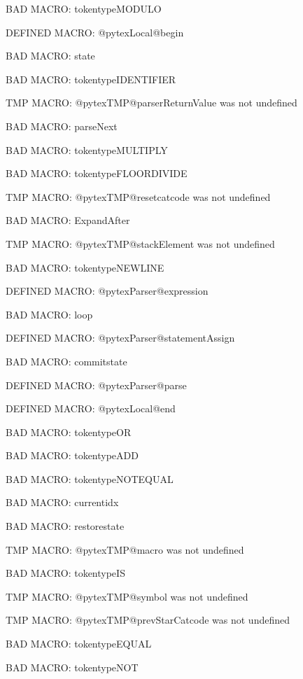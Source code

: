 BAD MACRO: tokentypeMODULO

\ifx\@pytexLocal@begin\undefined\else DEFINED MACRO: @pytexLocal@begin
\fi

BAD MACRO: state

BAD MACRO: tokentypeIDENTIFIER

\ifx\@pytexTMP@parserReturnValue\undefined\else TMP MACRO: @pytexTMP@parserReturnValue was not undefined
\fi

BAD MACRO: parseNext

BAD MACRO: tokentypeMULTIPLY

BAD MACRO: tokentypeFLOORDIVIDE

\ifx\@pytexTMP@resetcatcode\undefined\else TMP MACRO: @pytexTMP@resetcatcode was not undefined
\fi

BAD MACRO: ExpandAfter

\ifx\@pytexTMP@stackElement\undefined\else TMP MACRO: @pytexTMP@stackElement was not undefined
\fi

BAD MACRO: tokentypeNEWLINE

\ifx\@pytexParser@expression\undefined\else DEFINED MACRO: @pytexParser@expression
\fi

BAD MACRO: loop

\ifx\@pytexParser@statementAssign\undefined\else DEFINED MACRO: @pytexParser@statementAssign
\fi

BAD MACRO: commitstate

\ifx\@pytexParser@parse\undefined\else DEFINED MACRO: @pytexParser@parse
\fi

\ifx\@pytexLocal@end\undefined\else DEFINED MACRO: @pytexLocal@end
\fi

BAD MACRO: tokentypeOR

BAD MACRO: tokentypeADD

BAD MACRO: tokentypeNOTEQUAL

BAD MACRO: currentidx

BAD MACRO: restorestate

\ifx\@pytexTMP@macro\undefined\else TMP MACRO: @pytexTMP@macro was not undefined
\fi

BAD MACRO: tokentypeIS

\ifx\@pytexTMP@symbol\undefined\else TMP MACRO: @pytexTMP@symbol was not undefined
\fi

\ifx\@pytexTMP@prevStarCatcode\undefined\else TMP MACRO: @pytexTMP@prevStarCatcode was not undefined
\fi

BAD MACRO: tokentypeEQUAL

BAD MACRO: tokentypeNOT

